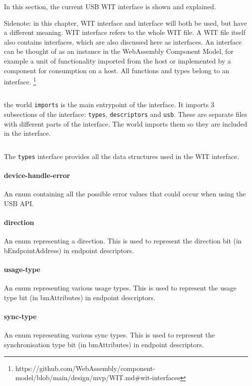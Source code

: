 In this section, the current USB WIT interface is shown and explained.

Sidenote: in this chapter, WIT interface and interface will both be used, but have a different meaning.
WIT interface refers to the whole WIT file.
A WIT file itself also contains interfaces, which are also discussed here as interfaces. An interface can be thought of as an instance in the WebAssembly Component Model, for example a unit of functionality imported from the host or implemented by a component for consumption on a host. All functions and types belong to an interface. \footnote{https://github.com/WebAssembly/component-model/blob/main/design/mvp/WIT.md\#wit-interfaces}

\inputminted{yaml}{wit/world.wit}

the world \texttt{imports} is the main entrypoint of the interface. It imports 3 subsections of the interface: \texttt{types}, \texttt{descriptors} and \texttt{usb}. These are separate files with different parts of the interface. The world imports them so they are included in the interface.

\inputminted{yaml}{wit/types.wit}

The \texttt{types} interface provides all the data structures used in the WIT interface.

\paragraph{device-handle-error}
An enum containing all the possible error values that could occur when using the USB API.

\paragraph{direction}
An enum representing a direction. This is used to represent the direction bit (in bEndpointAddress) in endpoint descriptors.

\paragraph{usage-type}
An enum representing various usage types. This is used to represent the usage type bit (in bmAttributes) in endpoint descriptors.

\paragraph{sync-type}
An enum representing various sync types. This is used to represent the synchronisation type bit (in bmAttributes) in endpoint descriptors.

